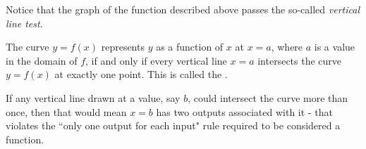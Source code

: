 \documentclass{ximera}
\begin{document}
%


Notice that the graph of the function described above passes the so-called
\textit{vertical line test}.

\begin{theorem}
The curve $y=f(x)$ represents $y$ as a function of $x$ at $x=a$, where $a$ is a value in the domain of $f$, if and only if every vertical line $x=a$ intersects the curve $y=f(x)$ at
exactly one point. This is called the .
\end{theorem}

If any vertical line drawn at a value, say $b$, could intersect the curve more than once, then that would mean $x=b$ has two outputs associated with it - that violates the ``only one output for each input" rule required to be considered a function.
\end{document}
